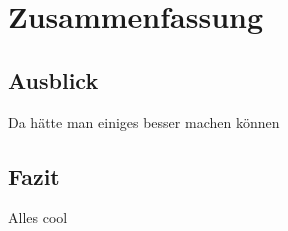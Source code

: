 \chapter{Zusammenfassung}

\section{Ausblick}

Da hätte man einiges besser machen können

\section{Fazit}

Alles cool

